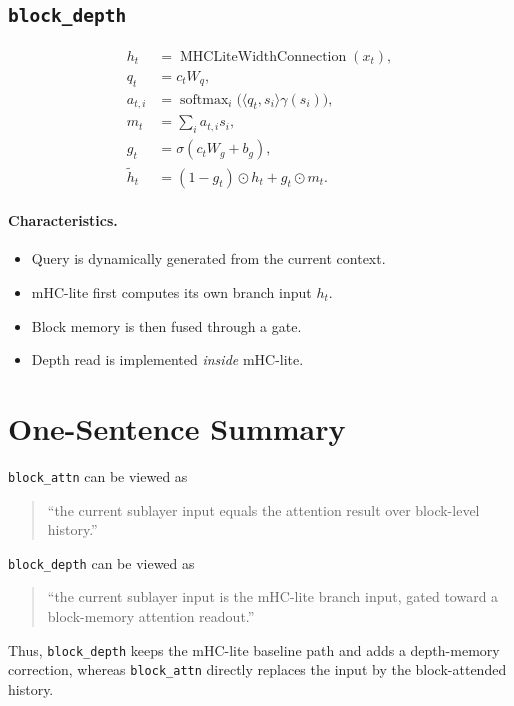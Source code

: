 \documentclass[11pt]{article}
\begin{document}
\subsection{\texttt{block\_depth}}

\begin{align}
    h_t &= \operatorname{MHCLiteWidthConnection}(x_t), \\
    q_t &= c_t W_q, \\
    a_{t,i} &= \operatorname{softmax}_i\!\big(\langle q_t, s_i \rangle \gamma(s_i)\big), \\
    m_t &= \sum_i a_{t,i} s_i, \\
    g_t &= \sigma(c_t W_g + b_g), \\
    \tilde{h}_t &= (1-g_t)\odot h_t + g_t \odot m_t.
\end{align}

\paragraph{Characteristics.}
\begin{itemize}
    \item Query is dynamically generated from the current context.
    \item mHC-lite first computes its own branch input $h_t$.
    \item Block memory is then fused through a gate.
    \item Depth read is implemented \emph{inside} mHC-lite.
\end{itemize}

\section{One-Sentence Summary}

\texttt{block\_attn} can be viewed as
\begin{quote}
``the current sublayer input equals the attention result over block-level history.''
\end{quote}

\texttt{block\_depth} can be viewed as
\begin{quote}
``the current sublayer input is the mHC-lite branch input, gated toward a block-memory attention readout.''
\end{quote}

Thus, \texttt{block\_depth} keeps the mHC-lite baseline path and adds a depth-memory correction, whereas \texttt{block\_attn} directly replaces the input by the block-attended history.
\end{document}
